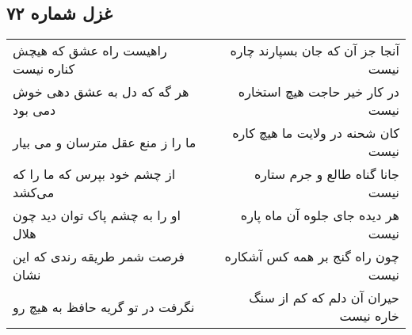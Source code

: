 \begin{center}
\section*{غزل شماره ۷۲}
\label{sec:sh072}
\begin{longtable}{l p{0.5cm} r}
راهیست راه عشق که هیچش کناره نیست
&&
آنجا جز آن که جان بسپارند چاره نیست
\\
هر گه که دل به عشق دهی خوش دمی بود
&&
در کار خیر حاجت هیچ استخاره نیست
\\
ما را ز منع عقل مترسان و می بیار
&&
کان شحنه در ولایت ما هیچ کاره نیست
\\
از چشم خود بپرس که ما را که می‌کشد
&&
جانا گناه طالع و جرم ستاره نیست
\\
او را به چشم پاک توان دید چون هلال
&&
هر دیده جای جلوه آن ماه پاره نیست
\\
فرصت شمر طریقه رندی که این نشان
&&
چون راه گنج بر همه کس آشکاره نیست
\\
نگرفت در تو گریه حافظ به هیچ رو
&&
حیران آن دلم که کم از سنگ خاره نیست
\\
\end{longtable}
\end{center}
